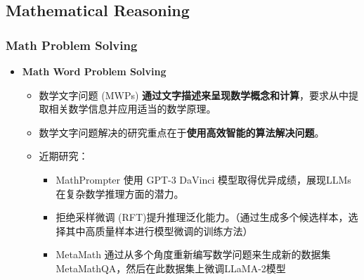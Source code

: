 \subsection{Mathematical Reasoning}
\begin{frame}
	\frametitle{Math Problem Solving}
	\begin{itemize}
		\item \textbf{Math Word Problem Solving}
		      \begin{itemize}
			      \item 数学文字问题 (MWPs) \textbf{通过文字描述来呈现数学概念和计算}，要求从中提取相关数学信息并应用适当的数学原理。
			      \item 数学文字问题解决的研究重点在于\textbf{使用高效智能的算法解决问题}。
			            \pause
			      \item 近期研究：
			            \begin{itemize}
				            \item MathPrompter 使用 GPT-3 DaVinci 模型取得优异成绩，展现LLMs在复杂数学推理方面的潜力。
				            \item 拒绝采样微调 (RFT)提升推理泛化能力。（通过生成多个候选样本，选择其中高质量样本进行模型微调的训练方法）
				            \item MetaMath 通过从多个角度重新编写数学问题来生成新的数据集MetaMathQA，然后在此数据集上微调LLaMA-2模型
			            \end{itemize}
		      \end{itemize}
	\end{itemize}
\end{frame}
